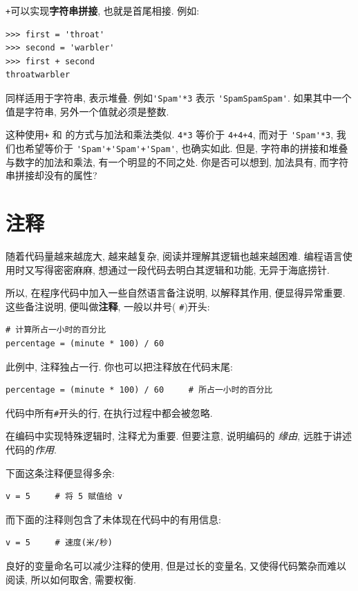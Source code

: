 \documentclass[10pt]{book}
\begin{document}
 {\tt +}可以实现{\bf 字符串拼接}, 也就是首尾相接. 例如:

\begin{verbatim}
>>> first = 'throat'
>>> second = 'warbler'
>>> first + second
throatwarbler
\end{verbatim}
%
 {\tt *} 同样适用于字符串, 表示堆叠. 例如\verb"'Spam'*3" 表示
\verb"'SpamSpamSpam'". 如果其中一个值是字符串, 另外一个值就必须是整数. 

这种使用{\tt +} 和 {\tt *}的方式与加法和乘法类似. 
 {\tt 4*3} 等价于 {\tt 4+4+4}, 
而对于 \verb"'Spam'*3",  
我们也希望等价于 \verb"'Spam'+'Spam'+'Spam'", 也确实如此. 
但是, 字符串的拼接和堆叠与数字的加法和乘法, 有一个明显的不同之处. 
你是否可以想到, 加法具有, 而字符串拼接却没有的属性?



\section{注释}

随着代码量越来越庞大, 越来越复杂, 
阅读并理解其逻辑也越来越困难. 
编程语言使用时又写得密密麻麻, 
想通过一段代码去明白其逻辑和功能, 无异于海底捞针. 

所以, 在程序代码中加入一些自然语言备注说明, 
以解释其作用, 便显得异常重要. 
这些备注说明, 便叫做{\bf 注释},  一般以井号( \verb"#")开头:

\begin{verbatim}
# 计算所占一小时的百分比
percentage = (minute * 100) / 60
\end{verbatim}
%
此例中, 注释独占一行. 你也可以把注释放在代码末尾:

\begin{verbatim}
percentage = (minute * 100) / 60     # 所占一小时的百分比
\end{verbatim}
%
代码中所有{\tt \#}开头的行, 在执行过程中都会被忽略. 

在编码中实现特殊逻辑时, 注释尤为重要. 
但要注意, 说明编码的 {\em 缘由},
远胜于讲述代码的{\em 作用}. 

下面这条注释便显得多余:

\begin{verbatim}
v = 5     # 将 5 赋值给 v
\end{verbatim}
%

而下面的注释则包含了未体现在代码中的有用信息:

\begin{verbatim}
v = 5     # 速度(米/秒) 
\end{verbatim}
%
良好的变量命名可以减少注释的使用, 
但是过长的变量名, 又使得代码繁杂而难以阅读, 
所以如何取舍, 需要权衡. 
\end{document}
